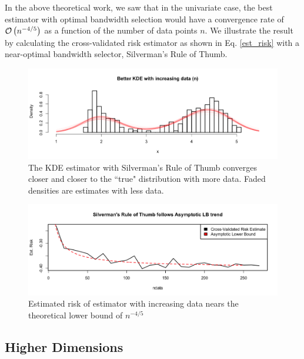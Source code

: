 \documentclass[12pt]{article}
\begin{document}
In the above theoretical work, we saw that in the univariate case, the
best estimator with optimal bandwidth selection would have a convergence
rate of \(\mathcal{O}\left( n^{-4/5} \right)\) as a function of the number of data points
\(n\). We illustrate the result by calculating the cross-validated risk
estimator as shown in Eq. \ref{est_risk} with a near-optimal bandwidth
selector, Silverman's Rule of Thumb.

\begin{figure}[h]
\centering
\label{fig:kde_data}
\caption{The KDE estimator with Silverman's Rule of Thumb converges closer and closer to the ``true" distribution with more data. Faded densities are estimates with less data.}
\includegraphics[scale=.5]{kde_data}
\end{figure}

\begin{figure}[h]
\centering
\label{fig:lb}
\caption{Estimated risk of estimator with increasing data nears the theoretical lower bound of $n^{-4/5}$}
\includegraphics[scale=.5]{lb_silverman}
\end{figure}

\subsection{Higher Dimensions}\label{higher-dimensions}
\end{document}
